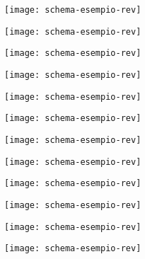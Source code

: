 \begin{figure}[H]

	\begin{subfigure}{.15\textwidth}
		\texttt{[image: schema-esempio-rev]}
	\end{subfigure}\hfill
	\begin{subfigure}{.15\textwidth}
		\texttt{[image: schema-esempio-rev]}
	\end{subfigure}\hfill
	\begin{subfigure}{.15\textwidth}
		\texttt{[image: schema-esempio-rev]}
	\end{subfigure}\hfill
	\begin{subfigure}{.15\textwidth}
		\texttt{[image: schema-esempio-rev]}
	\end{subfigure}\hfill
	\begin{subfigure}{.15\textwidth}
		\texttt{[image: schema-esempio-rev]}
	\end{subfigure}\hfill
	\begin{subfigure}{.15\textwidth}
		\texttt{[image: schema-esempio-rev]}
	\end{subfigure}

	\begin{subfigure}{.15\textwidth}
		\texttt{[image: schema-esempio-rev]}
	\end{subfigure}\hfill
	\begin{subfigure}{.15\textwidth}
		\texttt{[image: schema-esempio-rev]}
	\end{subfigure}\hfill
	\begin{subfigure}{.15\textwidth}
		\texttt{[image: schema-esempio-rev]}
	\end{subfigure}\hfill
	\begin{subfigure}{.15\textwidth}
		\texttt{[image: schema-esempio-rev]}
	\end{subfigure}\hfill
	\begin{subfigure}{.15\textwidth}
		\texttt{[image: schema-esempio-rev]}
	\end{subfigure}\hfill
	\begin{subfigure}{.15\textwidth}
		\texttt{[image: schema-esempio-rev]}
	\end{subfigure}


\end{figure}
